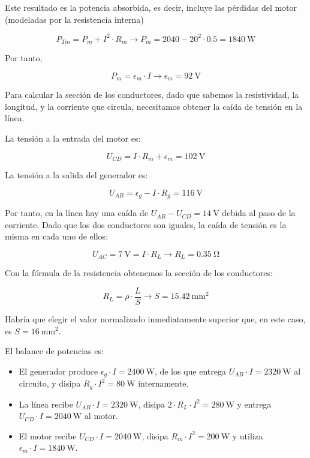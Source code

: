 \documentclass[10pt]{article}
\begin{document}
Este resultado es la potencia absorbida, es decir, incluye las pérdidas del motor (modeladas por la resistencia interna)

\[
  P_{Tm} = P_m + I^2 \cdot R_m \rightarrow P_m = 2040 - 20^2 \cdot 0.5 = \SI{1840}{\watt}
\]

Por tanto,

\[
  P_m = \epsilon_m \cdot I \rightarrow \epsilon_m = \SI{92}{\volt}
\]

Para calcular la sección de los conductores, dado que sabemos la resistividad, la longitud, y la corriente que circula, necesitamos obtener la caída de tensión en la línea.

La tensión a la entrada del motor es:

\[
  U_{CD} = I \cdot R_m + \epsilon_m = \SI{102}{\volt}
\]

La tensión a la salida del generador es:


\[
  U_{AB} = \epsilon_g - I \cdot R_g = \SI{116}{\volt}
\]

Por tanto, en la línea hay una caída de $U_{AB} - U_{CD} = \SI{14}{\volt}$ debida al paso de la corriente. Dado que los dos conductores son iguales, la caída de tensión es la misma en cada uno de ellos:

\[
  U_{AC} = \SI{7}{\volt} = I \cdot R_L \rightarrow R_L = \SI{0.35}{\ohm}
\]

Con la fórmula de la resistencia obtenemos la sección de los conductores:

\[
  R_L = \rho \cdot \frac{L}{S} \rightarrow S = \SI{15.42}{\milli\meter\squared}
\]

Habría que elegir el valor normalizado inmediatamente superior que, en este caso, es $S = \SI{16}{\milli\meter\squared}$.


El balance de potencias es:

\begin{itemize}
\item El generador produce $\epsilon_g \cdot I = \SI{2400}{\watt}$, de los que entrega $U_{AB} \cdot I = \SI{2320}{\watt}$ al circuito, y disipa $R_g \cdot I^2 = \SI{80}{\watt}$ internamente.
\item La línea recibe $U_{AB} \cdot I = \SI{2320}{\watt}$, disipa $2 \cdot R_L \cdot I^2 = \SI{280}{\watt}$ y entrega $U_{CD} \cdot I = \SI{2040}{\watt}$ al motor.
\item El motor recibe $U_{CD} \cdot I = \SI{2040}{\watt}$, disipa $R_m \cdot I^2 = \SI{200}{\watt}$ y utiliza $\epsilon_m \cdot I = \SI{1840}{\watt}$.  
\end{itemize}
\end{document}
